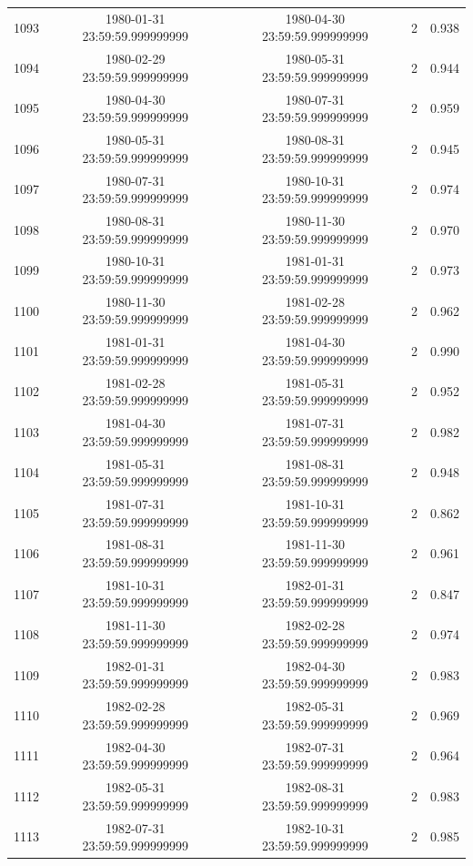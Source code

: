 \begin{table}
\begin{tabular}{lcccc}
1093 & 1980-01-31 23:59:59.999999999 & 1980-04-30 23:59:59.999999999 & 2 & 0.938 \\
1094 & 1980-02-29 23:59:59.999999999 & 1980-05-31 23:59:59.999999999 & 2 & 0.944 \\
1095 & 1980-04-30 23:59:59.999999999 & 1980-07-31 23:59:59.999999999 & 2 & 0.959 \\
1096 & 1980-05-31 23:59:59.999999999 & 1980-08-31 23:59:59.999999999 & 2 & 0.945 \\
1097 & 1980-07-31 23:59:59.999999999 & 1980-10-31 23:59:59.999999999 & 2 & 0.974 \\
1098 & 1980-08-31 23:59:59.999999999 & 1980-11-30 23:59:59.999999999 & 2 & 0.970 \\
1099 & 1980-10-31 23:59:59.999999999 & 1981-01-31 23:59:59.999999999 & 2 & 0.973 \\
1100 & 1980-11-30 23:59:59.999999999 & 1981-02-28 23:59:59.999999999 & 2 & 0.962 \\
1101 & 1981-01-31 23:59:59.999999999 & 1981-04-30 23:59:59.999999999 & 2 & 0.990 \\
1102 & 1981-02-28 23:59:59.999999999 & 1981-05-31 23:59:59.999999999 & 2 & 0.952 \\
1103 & 1981-04-30 23:59:59.999999999 & 1981-07-31 23:59:59.999999999 & 2 & 0.982 \\
1104 & 1981-05-31 23:59:59.999999999 & 1981-08-31 23:59:59.999999999 & 2 & 0.948 \\
1105 & 1981-07-31 23:59:59.999999999 & 1981-10-31 23:59:59.999999999 & 2 & 0.862 \\
1106 & 1981-08-31 23:59:59.999999999 & 1981-11-30 23:59:59.999999999 & 2 & 0.961 \\
1107 & 1981-10-31 23:59:59.999999999 & 1982-01-31 23:59:59.999999999 & 2 & 0.847 \\
1108 & 1981-11-30 23:59:59.999999999 & 1982-02-28 23:59:59.999999999 & 2 & 0.974 \\
1109 & 1982-01-31 23:59:59.999999999 & 1982-04-30 23:59:59.999999999 & 2 & 0.983 \\
1110 & 1982-02-28 23:59:59.999999999 & 1982-05-31 23:59:59.999999999 & 2 & 0.969 \\
1111 & 1982-04-30 23:59:59.999999999 & 1982-07-31 23:59:59.999999999 & 2 & 0.964 \\
1112 & 1982-05-31 23:59:59.999999999 & 1982-08-31 23:59:59.999999999 & 2 & 0.983 \\
1113 & 1982-07-31 23:59:59.999999999 & 1982-10-31 23:59:59.999999999 & 2 & 0.985 \\

\end{tabular}
\end{table}
